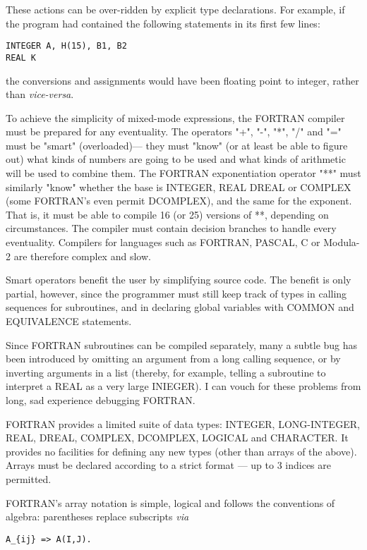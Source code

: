 These actions can be over-ridden by explicit type declarations. For example, if the program had contained the following statements in its first few lines:

\begin{verbatim}
INTEGER A, H(15), B1, B2 
REAL K
\end{verbatim}

the conversions and assignments would have been floating point to integer, rather than \textit{vice-versa}.

To achieve the simplicity of mixed-mode expressions, the FORTRAN compiler must be prepared for any eventuality. The operators "+", "-", "*", "/" and "=" must be "smart" (overloaded)— they must "know" (or at least be able to figure out) what kinds of numbers are going to be used and what kinds of arithmetic will be used to combine them. The FORTRAN exponentiation operator "**" must similarly "know" whether the base is INTEGER, REAL DREAL or COMPLEX (some FORTRAN's even permit DCOMPLEX), and the same for the exponent. That is, it must be able to compile 16 (or 25) versions of **, depending on circumstances. The compiler must contain decision branches to handle every eventuality. Compilers for languages such as FORTRAN, PASCAL, C or Modula-2 are therefore complex and slow.

Smart operators benefit the user by simplifying source code. The benefit is only partial, however, since the programmer must still keep track of types in calling sequences for subroutines, and in declaring global variables with COMMON and EQUIVALENCE statements.
 
Since FORTRAN subroutines can be compiled separately, many a subtle bug has been introduced by omitting an argument from a long calling sequence, or by inverting arguments in a list (thereby, for example, telling a subroutine to interpret a REAL as a very large INIEGER). I can vouch for these problems from long, sad experience debugging FORTRAN.

FORTRAN provides a limited suite of data types: INTEGER, LONG-INTEGER, REAL, DREAL, COMPLEX, DCOMPLEX, LOGICAL and CHARACTER. It provides no facilities for defining any new types (other than arrays of the above). Arrays must be declared according to a strict format — up to 3 indices are permitted.

FORTRAN's array notation is simple, logical and follows the conventions of algebra: parentheses replace subscripts \textit{via}

\begin{verbatim}
A_{ij} => A(I,J).
\end{verbatim}

